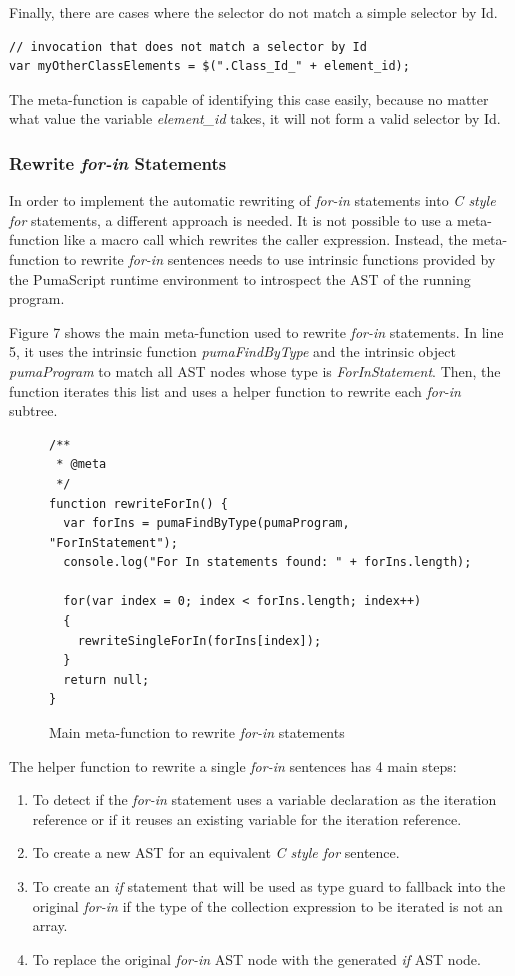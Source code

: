 \documentclass[preprint,10pt]{sigplanconf}
\begin{document}
Finally, there are cases where the selector do not match a simple selector by Id. 

\begin{lstlisting}
// invocation that does not match a selector by Id
var myOtherClassElements = $(".Class_Id_" + element_id);
\end{lstlisting}

The meta-function is capable of identifying this case easily, because no matter what value the variable \emph{element\_id} takes, it will not form a valid selector by Id.

\subsubsection{Rewrite \emph{for-in} Statements}
In order to implement the automatic rewriting of \emph{for-in} statements into \emph{C style for} statements, a different approach is needed. It is not possible to use a meta-function like a macro call which rewrites the caller expression. Instead, the meta-function to rewrite \emph{for-in} sentences needs to use intrinsic functions provided by the PumaScript runtime environment to introspect the AST of the running program.

Figure 7 shows the main meta-function used to rewrite \emph{for-in} statements. In line 5, it uses the intrinsic function \emph{pumaFindByType} and the intrinsic object \emph{pumaProgram} to match all AST nodes whose type is \emph{ForInStatement}. Then, the function iterates this list and uses a helper function to rewrite each \emph{for-in} subtree.

\begin{figure}
\begin{lstlisting}
/** 
 * @meta
 */
function rewriteForIn() {
  var forIns = pumaFindByType(pumaProgram, "ForInStatement");
  console.log("For In statements found: " + forIns.length);
  
  for(var index = 0; index < forIns.length; index++)
  {
    rewriteSingleForIn(forIns[index]);
  }
  return null;	
}
\end{lstlisting}
\caption{Main meta-function to rewrite \emph{for-in} statements}
\label{fig:7}
\end{figure}

The helper function to rewrite a single \emph{for-in} sentences has 4 main steps:
\begin{enumerate}
  \item To detect if the \emph{for-in} statement uses a variable declaration as the iteration reference or if it reuses an existing variable for the iteration reference.
  \item To create a new AST for an equivalent \emph{C style for} sentence.
  \item To create an \emph{if} statement that will be used as type guard to fallback into the original \emph{for-in} if the type of the collection expression to be iterated is not an array.
  \item To replace the original \emph{for-in} AST node with the generated \emph{if} AST node.
\end{enumerate}
\end{document}
